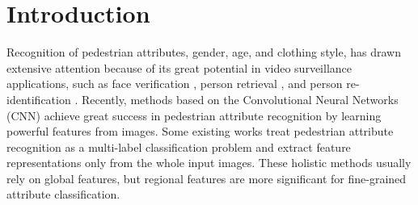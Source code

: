 \documentclass[10pt,twocolumn,letterpaper]{article}
\begin{document}
\section{Introduction} \label{sec:intro}

Recognition of pedestrian attributes, \eg gender, age, and clothing style, has drawn extensive attention because of its great potential in video surveillance applications, such as face verification \cite{facever}, person retrieval \cite{retrieval2,retrieval1}, and person re-identification \cite{layne2012pedestrian,Peng2016JointL,wang2018transferable}.
Recently, methods based on the Convolutional Neural Networks (CNN) \cite{resnet,bn} achieve great success in pedestrian attribute recognition by learning powerful features from images.
Some existing works \cite{deepmar,sudowe2015person} treat pedestrian attribute recognition as a multi-label classification problem and extract feature representations only from the whole input images.
These holistic methods usually rely on global features, but regional features are more significant for fine-grained attribute classification.
\end{document}
